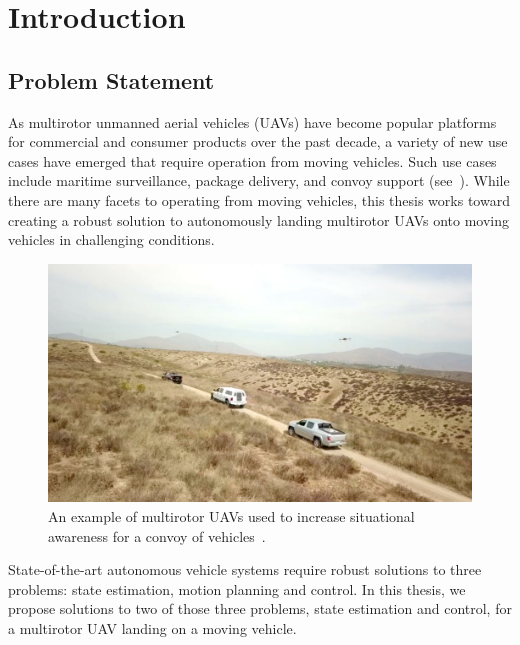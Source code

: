 
\chapter{Introduction}
\label{chp:introduction}

\section{Problem Statement}
As multirotor unmanned aerial vehicles (UAVs) have become popular
platforms for commercial and consumer products over the past decade, a variety
of new use cases have emerged that require operation from moving vehicles.
Such use cases include
maritime surveillance, package delivery, and convoy
support (see~). While there are
many facets to operating from moving vehicles, this thesis works toward creating
a robust solution to autonomously landing multirotor UAVs onto moving vehicles
in challenging conditions.

\begin{figure}[h]
  \centering
  \includegraphics[width=4.5in]{figures/drone_convoy_support.png}
  \caption[UAV Convoy Support]{An example of multirotor UAVs used to increase
  situational awareness for a convoy of
vehicles~\cite{ground_vehicle_based_drones}.}
%
  \label{fig:drone_convoy_support}
\end{figure}

State-of-the-art autonomous vehicle systems require robust solutions to three
problems: state estimation, motion planning and control. In this thesis,
we propose solutions to two of those three problems, state estimation and
control, for a multirotor UAV landing on a moving vehicle.

